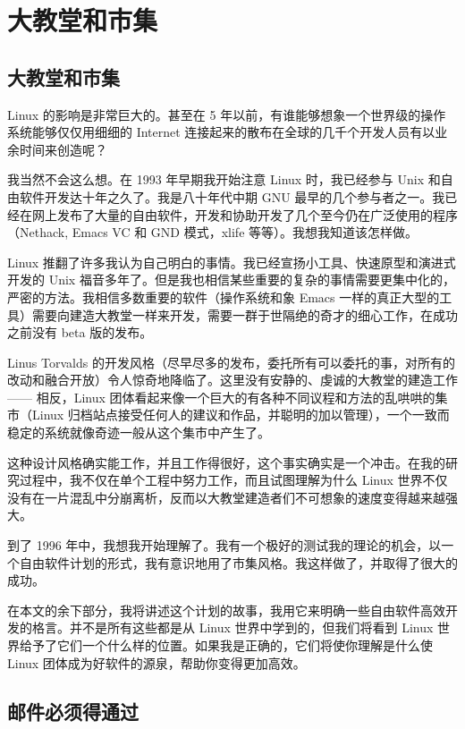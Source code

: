 \section{大教堂和市集}

\subsection{大教堂和市集}

Linux 的影响是非常巨大的。甚至在 5 年以前，有谁能够想象一个世界级的操作系统能够仅仅用细细的 Internet 连接起来的散布在全球的几千个开发人员有以业余时间来创造呢？


我当然不会这么想。在 1993 年早期我开始注意 Linux 时，我已经参与 Unix 和自由软件开发达十年之久了。我是八十年代中期 GNU 最早的几个参与者之一。我已经在网上发布了大量的自由软件，开发和协助开发了几个至今仍在广泛使用的程序（Nethack, Emacs VC 和 GND 模式，xlife 等等）。我想我知道该怎样做。

Linux 推翻了许多我认为自己明白的事情。我已经宣扬小工具、快速原型和演进式开发的 Unix 福音多年了。但是我也相信某些重要的复杂的事情需要更集中化的，严密的方法。我相信多数重要的软件（操作系统和象 Emacs 一样的真正大型的工具）需要向建造大教堂一样来开发，需要一群于世隔绝的奇才的细心工作，在成功之前没有 beta 版的发布。

Linus Torvalds 的开发风格（尽早尽多的发布，委托所有可以委托的事，对所有的改动和融合开放）令人惊奇地降临了。这里没有安静的、虔诚的大教堂的建造工作 —— 相反，Linux 团体看起来像一个巨大的有各种不同议程和方法的乱哄哄的集市（Linux 归档站点接受任何人的建议和作品，并聪明的加以管理），一个一致而稳定的系统就像奇迹一般从这个集市中产生了。

这种设计风格确实能工作，并且工作得很好，这个事实确实是一个冲击。在我的研究过程中，我不仅在单个工程中努力工作，而且试图理解为什么 Linux 世界不仅没有在一片混乱中分崩离析，反而以大教堂建造者们不可想象的速度变得越来越强大。

到了 1996 年中，我想我开始理解了。我有一个极好的测试我的理论的机会，以一个自由软件计划的形式，我有意识地用了市集风格。我这样做了，并取得了很大的成功。

在本文的余下部分，我将讲述这个计划的故事，我用它来明确一些自由软件高效开发的格言。并不是所有这些都是从 Linux 世界中学到的，但我们将看到 Linux 世界给予了它们一个什么样的位置。如果我是正确的，它们将使你理解是什么使 Linux 团体成为好软件的源泉，帮助你变得更加高效。


\subsection{邮件必须得通过}

